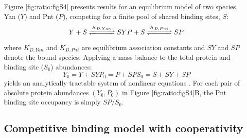Figure \ref{fig:ratio:figS4} presents results for an equilibrium model of two species, Yan ($Y$) and Pnt ($P$), competing for a finite pool of shared binding sites, $S$:
\begin{equation}
Y + S \xrightleftharpoons{\,K_{D,Yan}\,} SY
P + S \xrightleftharpoons{\,K_{D,Pnt}\,} SP
\end{equation}
where $K_{D,Yan}$ and $K_{D,Pnt}$ are equilibrium association constants and $SY$ and $SP$ denote the bound species. Applying a mass balance to the total protein and binding site ($S_0$) abundances:
\begin{equation}
Y_0 = Y + SY
P_0 = P + SP
S_0 = S + SY + SP
\end{equation}
yields an analytically tractable system of nonlinear equations \cite{Wang1995}. For each pair of absolute protein abundances $(Y_0,P_0)$ in Figure \ref{fig:ratio:figS4}B, the Pnt binding site occupancy is simply $SP/S_0$.

\subsection{Competitive binding model with cooperativity}
\label{appendix:methods:ratio:competitive_model}

